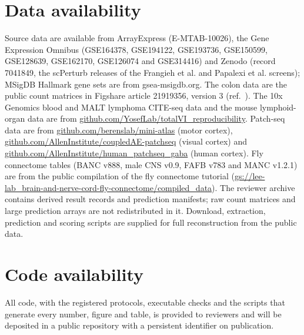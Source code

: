\documentclass[pdflatex,sn-vancouver-num,iicol]{sn-jnl}
\begin{document}
\section*{Data availability}
Source data are available from ArrayExpress (E-MTAB-10026), the Gene Expression Omnibus (GSE164378, GSE194122, GSE193736, GSE150599, GSE128639, GSE162170, GSE126074 and GSE314416) and Zenodo (record 7041849, the scPerturb releases of the Frangieh et al. and Papalexi et al. screens); MSigDB Hallmark gene sets are from gsea-msigdb.org. The colon data are the public count matrices in Figshare article 21919356, version 3 (ref.~). The 10x Genomics blood and MALT lymphoma CITE-seq data and the mouse lymphoid-organ data are from \url{github.com/YosefLab/totalVI_reproducibility}. Patch-seq data are from \url{github.com/berenslab/mini-atlas} (motor cortex), \url{github.com/AllenInstitute/coupledAE-patchseq} (visual cortex) and \url{github.com/AllenInstitute/human_patchseq_gaba} (human cortex). Fly connectome tables (BANC v888, male CNS v0.9, FAFB v783 and MANC v1.2.1) are from the public compilation of the fly connectome tutorial (\url{gs://lee-lab_brain-and-nerve-cord-fly-connectome/compiled_data}). The reviewer archive contains derived result records and prediction manifests; raw count matrices and large prediction arrays are not redistributed in it. Download, extraction, prediction and scoring scripts are supplied for full reconstruction from the public data.

\section*{Code availability}
All code, with the registered protocols, executable checks and the scripts that generate every number, figure and table, is provided to reviewers and will be deposited in a public repository with a persistent identifier on publication.

\ifdefined\ReaderVersion\else
  \setlength{\bibsep}{1.5pt}
\fi
\begingroup
\ifdefined\ReaderVersion\balance\else\singlespacing\fi
\renewcommand{\bibfont}{\normalfont\small}
\sloppy

\endgroup
\end{document}
